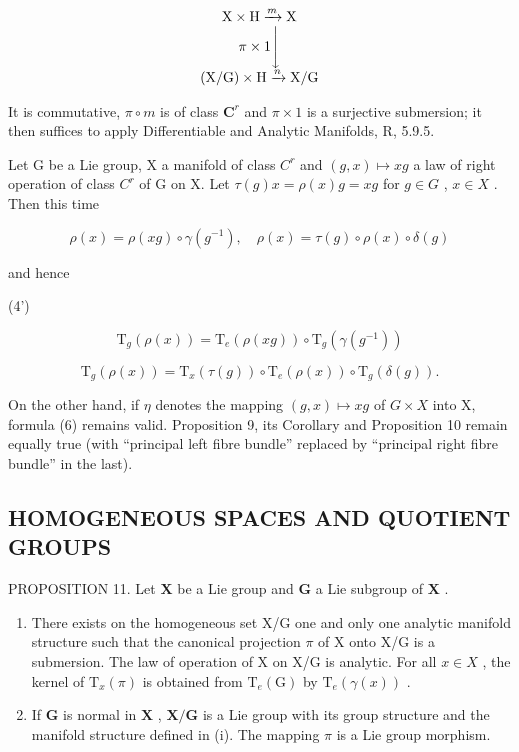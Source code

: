 \[
\begin{array}{c} \mathrm{X} \times \mathrm{H} \xrightarrow {m} \mathrm{X} \\ \pi \times 1 \Biggl \downarrow \\ (\mathrm{X} / \mathrm{G}) \times \mathrm{H} \xrightarrow {n} \mathrm{X} / \mathrm{G} \end{array}
\]

It is commutative, \(\pi \circ m\) is of class \(\mathbf{C}^r\) and \(\pi \times 1\) is a surjective submersion; it then suffices to apply Differentiable and Analytic Manifolds, R, 5.9.5.

Let G be a Lie group, X a manifold of class \(C^{r}\) and \((g, x) \mapsto xg\) a law of right operation of class \(C^{r}\) of G on X. Let \(\tau(g)x = \rho(x)g = xg\) for \(g \in G\) , \(x \in X\) . Then this time

\[
\rho (x) = \rho (x g) \circ \gamma (g ^ {- 1}), \quad \rho (x) = \tau (g) \circ \rho (x) \circ \delta (g)\tag{3'}
\]

and hence

(4')

\[
\mathrm{T} _ {g} (\rho (x)) = \mathrm{T} _ {e} (\rho (x g)) \circ \mathrm{T} _ {g} (\gamma (g ^ {- 1}))\tag{5'}
\]

\[
\mathrm{T} _ {g} (\rho (x)) = \mathrm{T} _ {x} (\tau (g)) \circ \mathrm{T} _ {e} (\rho (x)) \circ \mathrm{T} _ {g} (\delta (g)).
\]

On the other hand, if \(\eta\) denotes the mapping \((g, x) \mapsto xg\) of \(G \times X\) into X, formula (6) remains valid. Proposition 9, its Corollary and Proposition 10 remain equally true (with ``principal left fibre bundle'' replaced by ``principal right fibre bundle'' in the last).

\subsection{HOMOGENEOUS SPACES AND QUOTIENT GROUPS}

PROPOSITION 11. Let \(\mathbf{X}\) be a Lie group and \(\mathbf{G}\) a Lie subgroup of \(\mathbf{X}\) .

\begin{enumerate}
\def\labelenumi{(\roman{enumi})}
\item
  There exists on the homogeneous set X/G one and only one analytic manifold structure such that the canonical projection \(\pi\) of X onto X/G is a submersion. The law of operation of X on X/G is analytic. For all \(x \in X\) , the kernel of \(\mathrm{T}_{x}(\pi)\) is obtained from \(\mathrm{T}_{e}(\mathrm{G})\) by \(\mathrm{T}_{e}(\gamma(x))\) .
\item
  If \(\mathbf{G}\) is normal in \(\mathbf{X}\) , \(\mathbf{X} / \mathbf{G}\) is a Lie group with its group structure and the manifold structure defined in (i). The mapping \(\pi\) is a Lie group morphism.
\end{enumerate}

